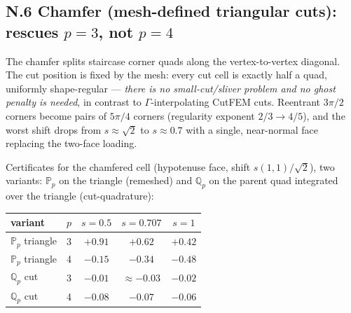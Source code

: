 \subsection*{N.6 Chamfer (mesh-defined triangular cuts): rescues $p=3$, not $p=4$}

The chamfer splits staircase corner quads along the vertex-to-vertex
diagonal. The cut position is fixed by the mesh: every cut cell is exactly
half a quad, uniformly shape-regular --- \emph{there is no small-cut/sliver
problem and no ghost penalty is needed}, in contrast to
$\Gamma$-interpolating CutFEM cuts. Reentrant $3\pi/2$ corners become pairs
of $5\pi/4$ corners (regularity exponent $2/3 \to 4/5$), and the worst
shift drops from $s \approx \sqrt2$ to $s \approx 0.7$ with a single,
near-normal face replacing the two-face loading.

Certificates for the chamfered cell (hypotenuse face, shift
$s(1,1)/\sqrt2$), two variants: $\mathbb P_p$ on the triangle (remeshed)
and $\mathbb Q_p$ on the parent quad integrated over the triangle
(cut-quadrature):

\begin{center}
\begin{tabular}{llccc}
\hline
variant & $p$ & $s=0.5$ & $s=0.707$ & $s=1$ \\
\hline
$\mathbb P_p$ triangle & 3 & $+0.91$ & $+0.62$ & $+0.42$ \\
$\mathbb P_p$ triangle & 4 & $\mathbf{-0.15}$ & $\mathbf{-0.34}$ & $\mathbf{-0.48}$ \\
$\mathbb Q_p$ cut      & 3 & $\mathbf{-0.01}$ & $\approx\mathbf{-0.03}$ & $\mathbf{-0.02}$ \\
$\mathbb Q_p$ cut      & 4 & $\mathbf{-0.08}$ & $\mathbf{-0.07}$ & $\mathbf{-0.06}$ \\
\hline
\end{tabular}
\end{center}

